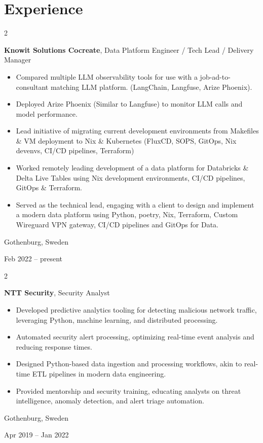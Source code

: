 \documentclass[10pt, letterpaper]{article}
\newenvironment{highlights}{
    \begin{itemize}[
        topsep=0.10 cm,
        parsep=0.10 cm,
        partopsep=0pt,
        itemsep=0pt,
        leftmargin=0.4 cm + 10pt
    ]
}{
    \end{itemize}
} %
\newenvironment{twocolentry}[2][]{
    \onecolentry
    \def\secondColumn{#2}
    \setcolumnwidth{\fill, 4.5 cm}
    \begin{paracol}{2}
}{
    \switchcolumn \raggedleft \secondColumn
    \end{paracol}
    \endonecolentry
} %
\begin{document}
    
    \section{Experience}



        
        \begin{twocolentry}{
            Gothenburg, Sweden

        Feb 2022 – present
        }
            \textbf{Knowit Solutions Cocreate}, Data Platform Engineer / Tech Lead / Delivery Manager
            \begin{highlights}
                \item Compared multiple LLM observability tools for use with a job-ad-to-consultant matching LLM platform. (LangChain, Langfuse, Arize Phoenix).
                \item Deployed Arize Phoenix (Similar to Langfuse) to monitor LLM calls and model performance.
                \item Lead initiative of migrating current development environments from Makefiles \& VM deployment to Nix \& Kubernetes (FluxCD, SOPS, GitOps, Nix devenvs, CI/CD pipelines, Terraform)
                \item Worked remotely leading development of a data platform for Databricks \& Delta Live Tables using Nix development environments, CI/CD pipelines, GitOps \& Terraform.
                \item Served as the technical lead, engaging with a client to design and implement a modern data platform using Python, poetry, Nix, Terraform, Custom Wireguard VPN gateway, CI/CD pipelines and GitOps for Data.
            \end{highlights}
        \end{twocolentry}


        \vspace{0.2 cm}

        \begin{twocolentry}{
            Gothenburg, Sweden

        Apr 2019 – Jan 2022
        }
            \textbf{NTT Security}, Security Analyst
            \begin{highlights}
                \item Developed predictive analytics tooling for detecting malicious network traffic, leveraging Python, machine learning, and distributed processing.
                \item Automated security alert processing, optimizing real-time event analysis and reducing response times.
                \item Designed Python-based data ingestion and processing workflows, akin to real-time ETL pipelines in modern data engineering.
                \item Provided mentorship and security training, educating analysts on threat intelligence, anomaly detection, and alert triage automation.
            \end{highlights}
        \end{twocolentry}
\end{document}
